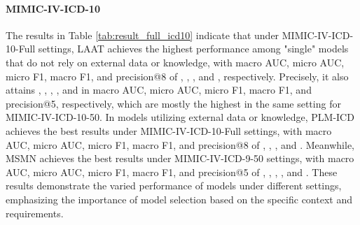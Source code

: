 \documentclass[11pt]{article}
\begin{document}
\paragraph{MIMIC-IV-ICD-10} The results in Table \ref{tab:result_full_icd10} indicate that under MIMIC-IV-ICD-10-Full settings, LAAT achieves the highest performance among "single" models that do not rely on external data or knowledge, with macro AUC, micro AUC, micro F1, macro F1, and precision@8 of , , ,  and  , respectively. Precisely, it also attains , , , , and  in macro AUC, micro AUC, micro F1, macro F1, and precision@5, respectively, which are mostly the highest in the same setting for MIMIC-IV-ICD-10-50. In models utilizing external data or knowledge, PLM-ICD achieves the best results under MIMIC-IV-ICD-10-Full settings, with macro AUC, micro AUC, micro F1, macro F1, and precision@8 of , , ,  and . Meanwhile, MSMN achieves the best results under MIMIC-IV-ICD-9-50 settings, with macro AUC, micro AUC, micro F1, macro F1, and precision@5 of , , , , and . These results demonstrate the varied performance of models under different settings, emphasizing the importance of model selection based on the specific context and requirements.
\end{document}
